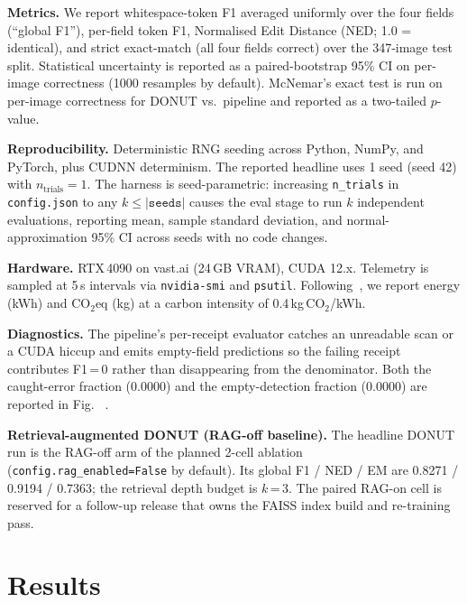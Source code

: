 \documentclass[conference]{IEEEtran}
\makeatletter
\newcommand{\figref}[1]{%
  \@ifundefined{r@#1}{\textit{[figure absent]}}{\ref{#1}}%
}
\makeatother
\begin{document}
\textbf{Metrics.}  We report whitespace-token F1 averaged uniformly
over the four fields (``global F1''), per-field token F1, Normalised
Edit Distance (NED; 1.0 = identical), and strict exact-match (all
four fields correct) over the 347-image test split.  Statistical
uncertainty is reported as a paired-bootstrap 95\% CI on per-image
correctness (1000 resamples by default).  McNemar's
exact test is run on per-image correctness for DONUT vs.\ pipeline
and reported as a two-tailed $p$-value.

\textbf{Reproducibility.}  Deterministic RNG seeding across Python,
NumPy, and PyTorch, plus CUDNN determinism.  The reported headline
uses 1 seed (seed 42) with
$n_{\text{trials}}=1$.  The harness is seed-parametric:
increasing \texttt{n\_trials} in \texttt{config.json} to any
$k\le|\texttt{seeds}|$ causes the eval stage to run $k$ independent
evaluations, reporting mean, sample standard deviation, and
normal-approximation 95\% CI across seeds with no code changes.

\textbf{Hardware.}  RTX\,4090 on vast.ai (24\,GB VRAM), CUDA 12.x.
Telemetry is sampled at 5\,s intervals via \texttt{nvidia-smi} and
\texttt{psutil}.  Following~\cite{strubell2019energy}, we report
energy (kWh) and CO$_2$eq (kg) at a carbon intensity of
0.4\,kg\,CO$_2$/kWh.

\textbf{Diagnostics.}  The pipeline's per-receipt evaluator catches
an unreadable scan or a CUDA hiccup and emits empty-field predictions
so the failing receipt contributes F1\,=\,0 rather than disappearing
from the denominator.  Both the caught-error fraction
(0.0000) and the empty-detection fraction
(0.0000) are reported in
Fig.~\figref{fig:pipeline_diagnostics}.

\textbf{Retrieval-augmented DONUT (RAG-off baseline).}  The headline
DONUT run is the RAG-off arm of the planned 2-cell ablation
(\texttt{config.rag\_enabled=False} by default).  Its global F1 / NED
/ EM are 0.8271 / 0.9194 / 0.7363; the
retrieval depth budget is $k$\,=\,3.  The paired RAG-on cell
is reserved for a follow-up release that owns the FAISS index build
and re-training pass.


\section{Results}
\label{sec:results}
\end{document}
